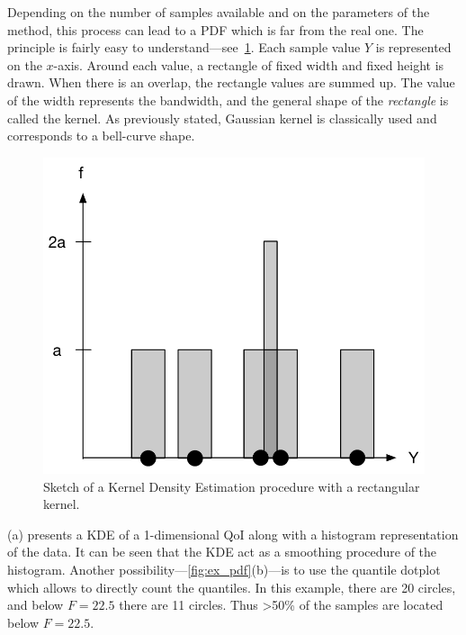 Depending on the number of samples available and on the parameters of the method, this process can lead to a PDF which is far from the real one. The principle is fairly easy to understand---see~\cref{fig:kde}. Each sample value $Y$ is represented on the $x$-axis. Around each value, a rectangle of fixed width and fixed height is drawn. When there is an overlap, the rectangle values are summed up. The value of the width represents the bandwidth, and the general shape of the \emph{rectangle} is called the kernel. As previously stated, Gaussian kernel is classically used and corresponds to a bell-curve shape.

\begin{figure}[!h]
\centering
\includegraphics[width=0.6\linewidth,keepaspectratio]{fig/literature/kde.pdf}
\caption{Sketch of a Kernel Density Estimation procedure with a rectangular kernel.}
\label{fig:kde}
\end{figure}

(a) presents a KDE of a 1-dimensional QoI along with a histogram representation of the data. It can be seen that the KDE act as a smoothing procedure of the histogram. Another possibility---\cref{fig:ex_pdf}(b)---is to use the quantile dotplot \cite{kay2016} which allows to directly count the quantiles. In this example, there are 20 circles, and below $F=22.5$ there are 11 circles. Thus >50\% of the samples are located below $F=22.5$.

